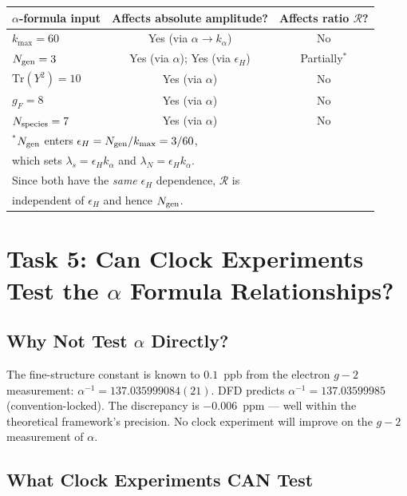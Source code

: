 \documentclass[11pt]{article}
\newcommand{\kalpha}{k_\alpha}
\theoremstyle{definition}
\theoremstyle{remark}
\begin{document}
\begin{center}
\begin{tabular}{lcc}
\toprule
$\alpha$-formula input & Affects absolute amplitude? & Affects ratio $\mathcal{R}$? \\
\midrule
$k_{\max} = 60$ & Yes (via $\alpha \to \kalpha$) & No \\
$N_{\rm gen} = 3$ & Yes (via $\alpha$); Yes (via $\epsilon_H$) & Partially$^*$ \\
$\mathrm{Tr}(Y^2) = 10$ & Yes (via $\alpha$) & No \\
$g_F = 8$ & Yes (via $\alpha$) & No \\
$N_{\rm species} = 7$ & Yes (via $\alpha$) & No \\
\bottomrule
\multicolumn{3}{l}{\footnotesize $^*$$N_{\rm gen}$ enters $\epsilon_H = N_{\rm gen}/k_{\max} = 3/60$,}\\
\multicolumn{3}{l}{\footnotesize which sets $\lambda_s = \epsilon_H \kalpha$ and $\lambda_N = \epsilon_H \kalpha$.}\\
\multicolumn{3}{l}{\footnotesize Since both have the \emph{same} $\epsilon_H$ dependence, $\mathcal{R}$ is}\\
\multicolumn{3}{l}{\footnotesize independent of $\epsilon_H$ and hence $N_{\rm gen}$.}
\end{tabular}
\end{center}

\section{Task 5: Can Clock Experiments Test the $\alpha$ Formula Relationships?}
\label{sec:tests}

\subsection{Why Not Test $\alpha$ Directly?}

The fine-structure constant is known to $0.1$~ppb from the electron
$g-2$ measurement: $\alpha^{-1} = 137.035999084(21)$. DFD predicts
$\alpha^{-1} = 137.03599985$ (convention-locked). The discrepancy is
$-0.006$~ppm --- well within the theoretical framework's precision.
No clock experiment will improve on the $g-2$ measurement of $\alpha$.

\subsection{What Clock Experiments CAN Test}
\end{document}
